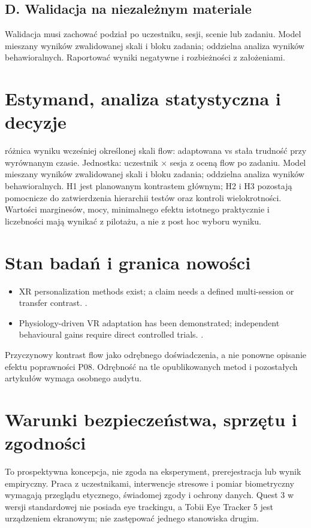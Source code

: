 \documentclass[11pt,a4paper]{article}
\begin{document}
\subsection{D. Walidacja na niezależnym materiale}
Walidacja musi zachować podział po uczestniku, sesji, scenie lub zadaniu. Model mieszany wyników zwalidowanej skali i bloku zadania; oddzielna analiza wyników behawioralnych. Raportować wyniki negatywne i rozbieżności z założeniami.
\section{Estymand, analiza statystyczna i decyzje}
różnica wyniku wcześniej określonej skali flow: adaptowana vs stała trudność przy wyrównanym czasie. Jednostka: uczestnik × sesja z oceną flow po zadaniu. Model mieszany wyników zwalidowanej skali i bloku zadania; oddzielna analiza wyników behawioralnych. H1 jest planowanym kontrastem głównym; H2 i H3 pozostają pomocnicze do zatwierdzenia hierarchii testów oraz kontroli wielokrotności. Wartości marginesów, mocy, minimalnego efektu istotnego praktycznie i liczebności mają wynikać z pilotażu, a nie z post hoc wyboru wyniku.
\section{Stan badań i granica nowości}
\begin{itemize}
\item XR personalization methods exist; a claim needs a defined multi-session or transfer contrast. \cite{xrprior1}.
\item Physiology-driven VR adaptation has been demonstrated; independent behavioural gains require direct controlled trials. \cite{xrprior2}.
\end{itemize}
Przyczynowy kontrast flow jako odrębnego doświadczenia, a nie ponowne opisanie efektu poprawności P08. Odrębność na tle opublikowanych metod i pozostałych artykułów wymaga osobnego audytu.
\section{Warunki bezpieczeństwa, sprzętu i zgodności}
To prospektywna koncepcja, nie zgoda na eksperyment, prerejestracja lub wynik empiryczny. Praca z uczestnikami, interwencje stresowe i pomiar biometryczny wymagają przeglądu etycznego, świadomej zgody i ochrony danych. Quest 3 w wersji standardowej nie posiada eye trackingu, a Tobii Eye Tracker 5 jest urządzeniem ekranowym; nie zastępować jednego stanowiska drugim.
\end{document}
